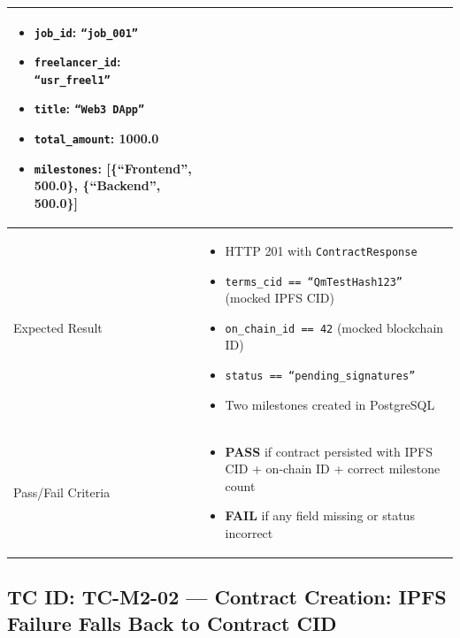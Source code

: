 \documentclass[12pt,a4paper]{article}
\newcommand{\passresult}{\textcolor{passgreen}{\textbf{PASS}}}
\newcommand{\failresult}{\textcolor{failred}{\textbf{FAIL}}}
\begin{document}
\begin{tabular}{|p{}|p{}|}
\begin{itemize}[nosep, leftmargin=*]
  \item \texttt{job\_id}: \texttt{``job\_001''}
  \item \texttt{freelancer\_id}: \texttt{``usr\_freel1''}
  \item \texttt{title}: \texttt{``Web3 DApp''}
  \item \texttt{total\_amount}: 1000.0
  \item \texttt{milestones}: [\{``Frontend'', 500.0\}, \{``Backend'', 500.0\}]
\end{itemize} \\
\hline
Expected Result &
\begin{itemize}[nosep, leftmargin=*]
  \item HTTP 201 with \texttt{ContractResponse}
  \item \texttt{terms\_cid == ``QmTestHash123''} (mocked IPFS CID)
  \item \texttt{on\_chain\_id == 42} (mocked blockchain ID)
  \item \texttt{status == ``pending\_signatures''}
  \item Two milestones created in PostgreSQL
\end{itemize} \\
\hline
Pass/Fail Criteria &
\begin{itemize}[nosep, leftmargin=*]
  \item \passresult{} if contract persisted with IPFS CID + on-chain ID + correct milestone count
  \item \failresult{} if any field missing or status incorrect
\end{itemize} \\
\hline
\end{tabular}

\vspace{0.8cm}

\subsection{TC ID: TC-M2-02 --- Contract Creation: IPFS Failure Falls Back to Contract CID}
\end{document}
